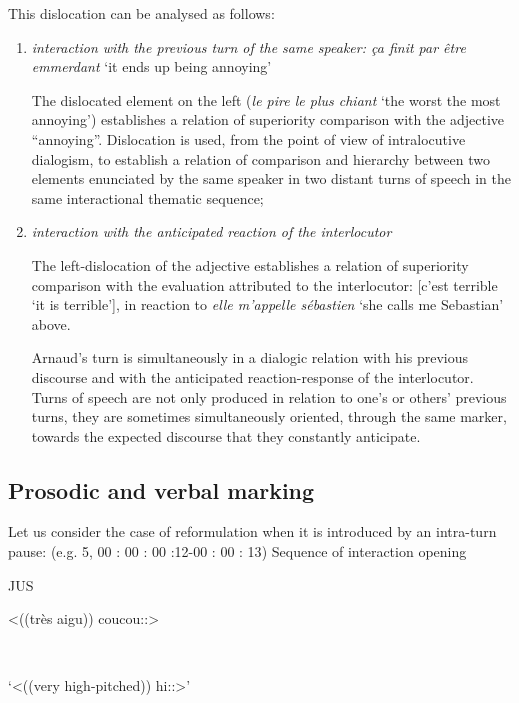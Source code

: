 \documentclass[output=paper]{langscibook}
\begin{document}
\z 

{This dislocation can be analysed as follows:}

\begin{enumerate}

\item \textit{interaction with the previous turn of the same speaker: ça finit par être emmerdant} ‘it ends up being annoying’

The dislocated element on the left (\textit{le pire le plus chiant} ‘the worst the most annoying’) establishes a relation of superiority comparison with the adjective “annoying”. Dislocation is used, from the point of view of intralocutive dialogism, to establish a relation of comparison and hierarchy between two elements enunciated by the same speaker in two distant turns of speech in the same interactional thematic sequence;

\item \textit{interaction with the anticipated  reaction of the interlocutor} 

The left-dislocation of the adjective establishes a relation of superiority comparison with the evaluation attributed to the interlocutor: [c’est terrible ‘it is terrible’]{, in} {reaction to \textit{elle m'appelle sébastien} ‘she calls me Sebastian’ above.}

Arnaud's turn is simultaneously in a dialogic relation with his previous discourse and with the anticipated reaction-response of the interlocutor. Turns of speech are not only produced in relation to one’s or others’ previous turns, they are sometimes simultaneously oriented, through the same marker, towards the expected discourse that they constantly anticipate.

\end{enumerate}


\subsection{Prosodic and verbal marking}


\ea 
\label{ex:8:6}

{Let us consider the case of reformulation when it is introduced by an intra-turn pause:}
{(e.g. 5,} 00 : 00 : 00 :12-00 : 00 : 13{)}{ Sequence of interaction opening} \textbf{}

\upshape\ttfamily
\parbox{8mm}{JUS}{<((très aigu)) coucou::>}\\
\parbox{8mm}{~}{  ‘<((very high-pitched)) hi::>’}\medskip
\end{document}
